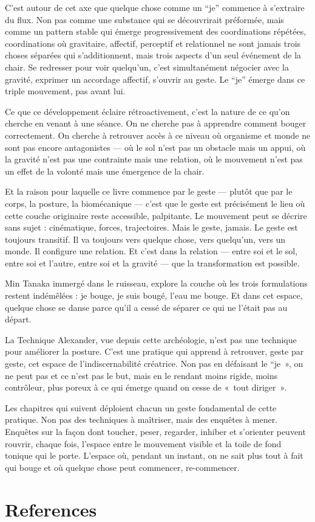 \documentclass[
  french,
  letterpaper,
  DIV=11,
  numbers=noendperiod]{scrreprt}
\begin{document}
C'est autour de cet axe que quelque chose comme un ``je'' commence à
s'extraire du flux. Non pas comme une substance qui se découvrirait
préformée, mais comme un pattern stable qui émerge progressivement des
coordinations répétées, coordinations où gravitaire, affectif, perceptif
et relationnel ne sont jamais trois choses séparées qui s'additionnent,
mais trois aspects d'un seul événement de la chair. Se redresser pour
voir quelqu'un, c'est simultanément négocier avec la gravité, exprimer
un accordage affectif, s'ouvrir au geste. Le ``je'' émerge dans ce
triple mouvement, pas avant lui.

Ce que ce développement éclaire rétroactivement, c'est la nature de ce
qu'on cherche en venant à une séance. On ne cherche pas à apprendre
comment bouger correctement. On cherche à retrouver accès à ce niveau où
organisme et monde ne sont pas encore antagonistes --- où le sol n'est
pas un obstacle mais un appui, où la gravité n'est pas une contrainte
mais une relation, où le mouvement n'est pas un effet de la volonté mais
une émergence de la chair.

Et la raison pour laquelle ce livre commence par le geste --- plutôt que
par le corps, la posture, la biomécanique --- c'est que le geste est
précisément le lieu où cette couche originaire reste accessible,
palpitante. Le mouvement peut se décrire sans sujet : cinématique,
forces, trajectoires. Mais le geste, jamais. Le geste est toujours
transitif. Il va toujours vers quelque chose, vers quelqu'un, vers un
monde. Il configure une relation. Et c'est dans la relation --- entre
soi et le sol, entre soi et l'autre, entre soi et la gravité --- que la
transformation est possible.

Min Tanaka immergé dans le ruisseau, explore la couche où les trois
formulations restent indémêlées : je bouge, je suis bougé, l'eau me
bouge. Et dans cet espace, quelque chose se danse parce qu'il a cessé de
séparer ce qui ne l'était pas au départ.

La Technique Alexander, vue depuis cette archéologie, n'est pas une
technique pour améliorer la posture. C'est une pratique qui apprend à
retrouver, geste par geste, cet espace de l'indiscernabilité créatrice.
Non pas en défaisant le ``je~», on ne peut pas et ce n'est pas le but,
mais en le rendant moins rigide, moins contrôleur, plus poreux à ce qui
émerge quand on cesse de «~tout diriger~».~

Les chapitres qui suivent déploient chacun un geste fondamental de cette
pratique. Non pas des techniques à maîtriser, mais des enquêtes à mener.
Enquêtes sur la façon dont toucher, peser, regarder, inhiber et
s'orienter peuvent rouvrir, chaque fois, l'espace entre le mouvement
visible et la toile de fond tonique qui le porte. L'espace où, pendant
un instant, on ne sait plus tout à fait qui bouge et où quelque chose
peut commencer, re-commencer.


\chapter*{References}\label{references}


\protect{}\label{refs}
\end{document}
